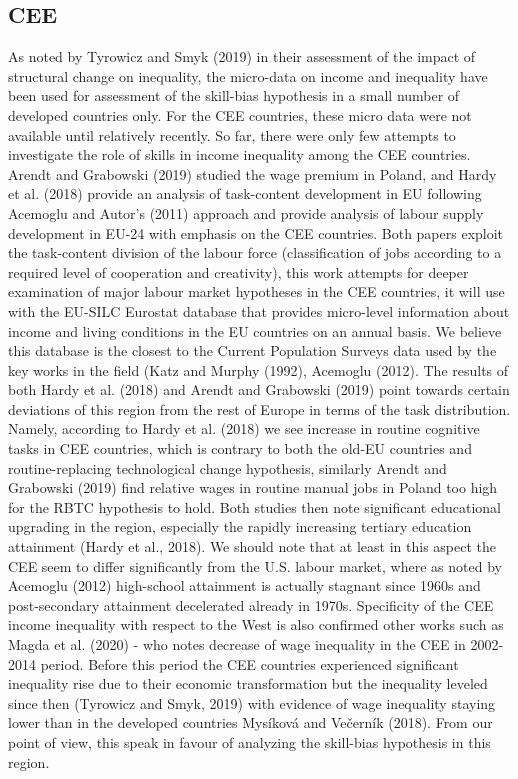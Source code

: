 \documentclass{article}
\begin{document}
\subsection{CEE}
As noted by Tyrowicz and Smyk (2019) in their assessment of the impact of structural change on inequality, the micro-data on income and inequality have been used for assessment of the skill-bias hypothesis in a small number of developed countries only. For the CEE countries, these micro data were not available until relatively recently.
So far, there were only few attempts to investigate the role of skills in income inequality among the CEE countries. Arendt and Grabowski (2019) studied the wage premium in Poland, and Hardy et al. (2018) provide an analysis of task-content development in EU following Acemoglu and Autor's (2011) approach and provide analysis of labour supply development in EU-24 with emphasis on the CEE countries. Both papers exploit the task-content division of the labour force (classification of jobs according to a required level of cooperation and creativity), this work attempts for deeper examination of major labour market hypotheses in the CEE countries, it will use with the EU-SILC Eurostat database that provides micro-level information about income and living conditions in the EU countries on an annual basis. We believe this database is the closest to the Current Population Surveys data used by the key works in the field (Katz and Murphy (1992), Acemoglu (2012).
The results of both Hardy et al. (2018) and Arendt and Grabowski (2019)  point towards certain deviations of this region from the rest of Europe in terms of the task distribution. Namely, according to Hardy et al. (2018) we see increase in routine cognitive tasks in CEE countries, which is contrary to both the old-EU countries and routine-replacing technological change hypothesis, similarly Arendt and Grabowski (2019) find relative wages in routine manual jobs in Poland too high for the RBTC hypothesis to hold. Both studies then note significant educational upgrading in the region, especially the rapidly increasing tertiary education attainment (Hardy et al., 2018). We should note that at least in this aspect the CEE seem to differ significantly from the U.S. labour market, where as noted by Acemoglu (2012) high-school attainment is actually stagnant since 1960s and post-secondary attainment decelerated already in 1970s. Specificity of the CEE income inequality with respect to the West is also confirmed other works such as Magda et al. (2020) - who notes decrease of wage inequality in the CEE in 2002-2014 period. Before this period the CEE countries experienced significant inequality rise due to their economic transformation but the inequality leveled since then (Tyrowicz and Smyk, 2019) with evidence of wage inequality staying lower than in the developed countries Mysíková and Večerník (2018). From our point of view, this speak in favour of analyzing the skill-bias hypothesis in this region.
\end{document}
